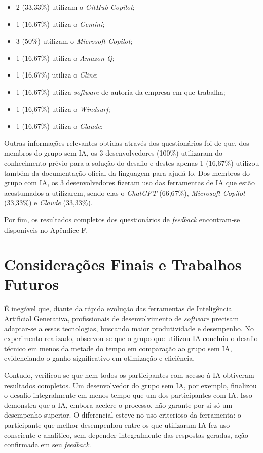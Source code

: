 \documentclass[english,brazilian]{UNISINOSartigo} %
\begin{document}
\begin{itemize}[leftmargin=1cm, itemsep=0.1em, topsep=0.1em]
\begin{itemize}[leftmargin=1.2cm, itemsep=0.1em, topsep=0.1em]
        \item 2 (33,33\%) utilizam o \textit{GitHub Copilot};
        \item 1 (16,67\%) utiliza o \textit{Gemini};
        \item 3 (50\%) utilizam o \textit{Microsoft Copilot};
        \item 1 (16,67\%) utiliza o \textit{Amazon Q};
        \item 1 (16,67\%) utiliza o \textit{Cline};
        \item 1 (16,67\%) utiliza \textit{software} de autoria da empresa em que trabalha;
        \item 1 (16,67\%) utiliza o \textit{Windsurf};
        \item 1 (16,67\%) utiliza o \textit{Claude};
    \end{itemize}
\end{itemize}

Outras informações relevantes obtidas através dos questionários foi de que, dos membros do grupo sem IA, os 3 desenvolvedores (100\%) utilizaram do conhecimento prévio para a solução do desafio e destes apenas 1 (16,67\%) utilizou também da documentação oficial da linguagem para ajudá-lo. Dos membros do grupo com IA, os 3 desenvolvedores fizeram uso das ferramentas de IA que estão acostumados a utilizarem, sendo elas o \textit{ChatGPT} (66,67\%), \textit{Microsoft Copilot} (33,33\%) e \textit{Claude} (33,33\%).

Por fim, os resultados completos dos questionários de \textit{feedback} encontram-se disponíveis no Apêndice F.

\section{Considerações Finais e Trabalhos Futuros}

É inegável que, diante da rápida evolução das ferramentas de Inteligência Artificial Generativa, profissionais de desenvolvimento de \textit{software} precisam adaptar-se a essas tecnologias, buscando maior produtividade e desempenho. No experimento realizado, observou-se que o grupo que utilizou IA concluiu o desafio técnico em menos da metade do tempo em comparação ao grupo sem IA, evidenciando o ganho significativo em otimização e eficiência.

Contudo, verificou-se que nem todos os participantes com acesso à IA obtiveram resultados completos. Um desenvolvedor do grupo sem IA, por exemplo, finalizou o desafio integralmente em menos tempo que um dos participantes com IA. Isso demonstra que a IA, embora acelere o processo, não garante por si só um desempenho superior. O diferencial esteve no uso criterioso da ferramenta: o participante que melhor desempenhou entre os que utilizaram IA fez uso consciente e analítico, sem depender integralmente das respostas geradas, ação confirmada em seu \textit{feedback}.
\end{document}
